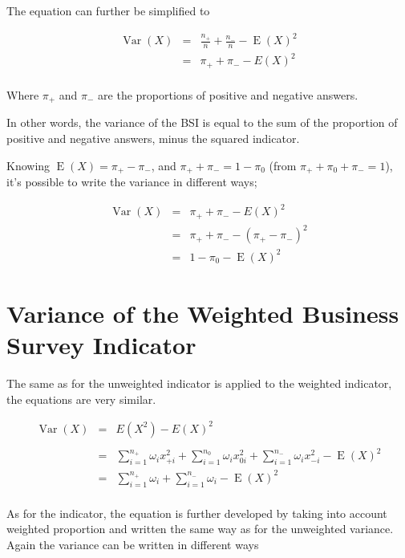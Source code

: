 \documentclass[12pt,a4paper,oneside]{book}
\DeclareMathOperator{\Var}{Var}
\DeclareMathOperator{\E}{E}
\begin{document}
The equation can further be simplified to

\begin{eqnarray}
    \Var(X) &=&  \frac{n_+}{n}  +  \frac{n_-}{n}  - \E(X)^2 \\
    &=& \pi_+ + \pi_- - E ( X )^2 \label{var1} \\ \nonumber
\end{eqnarray}

Where $\pi_+$ and $\pi_-$ are the proportions of positive and negative answers.

In other words, the variance of the BSI is equal to the sum of the proportion of positive and negative answers, minus the squared indicator.

Knowing $\E(X)=\pi_+ - \pi_-$, and $\pi_+ + \pi_- = 1 - \pi_0$ (from $\pi_+ + \pi_0 + \pi_- = 1$),
it's possible to write the variance in different ways;


\begin{eqnarray}
\Var(X) &=& \pi_+ + \pi_- - E ( X )^2  \nonumber \\
        &=& \pi_+ + \pi_- - ( \pi_+ - \pi_- )^2 \label{eq:var2} \\
        &=& 1 - \pi_0 - \E(X)^2 \label{eq:var3}
\end{eqnarray}




\section{Variance of the Weighted Business Survey Indicator}

The same as for the unweighted indicator is applied to the weighted indicator, the equations are very similar.

\begin{eqnarray}
\Var(X) &=&  E\left( X^2\right) - E\left( X\right)^2 \nonumber \\ \nonumber \\
    &=& \sum_{i=1}^{n_+} \omega_i x_{+i}^2 + \sum_{i=1}^{n_0} \omega_i x_{0i}^2  + \sum_{i=1}^{n_-} \omega_i x_{-i}^2 - \E(X)^2 \\
    &=& \sum_{i=1}^{n_+} \omega_i + \sum_{i=1}^{n_-} \omega_i - \E(X)^2 \nonumber \\
\end{eqnarray}

As for the indicator, the equation is further developed by taking into account weighted proportion and written the same way as for the unweighted variance. 
Again the variance can be written in different ways
\end{document}
